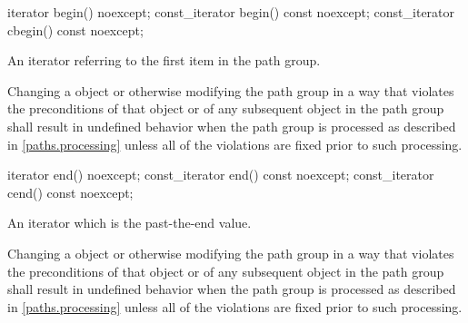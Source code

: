 \begin{itemdecl}
iterator begin() noexcept;
const_iterator begin() const noexcept;
const_iterator cbegin() const noexcept;
\end{itemdecl}
\begin{itemdescr}
\pnum
\returns
An iterator referring to the first  item in the path group.

\pnum
\remarks
Changing a  object or otherwise modifying the path group in a way that violates the preconditions of that  object or of any subsequent  object in the path group shall result in undefined behavior when the path group is processed as described in \ref{paths.processing} unless all of the violations are fixed prior to such processing.
\end{itemdescr}

\begin{itemdecl}
iterator end() noexcept;
const_iterator end() const noexcept;
const_iterator cend() const noexcept;
\end{itemdecl}
\begin{itemdescr}
\pnum
\returns
An iterator which is the past-the-end value.

\pnum
\remarks
Changing a  object or otherwise modifying the path group in a way that violates the preconditions of that  object or of any subsequent  object in the path group shall result in undefined behavior when the path group is processed as described in \ref{paths.processing} unless all of the violations are fixed prior to such processing.
\end{itemdescr}

